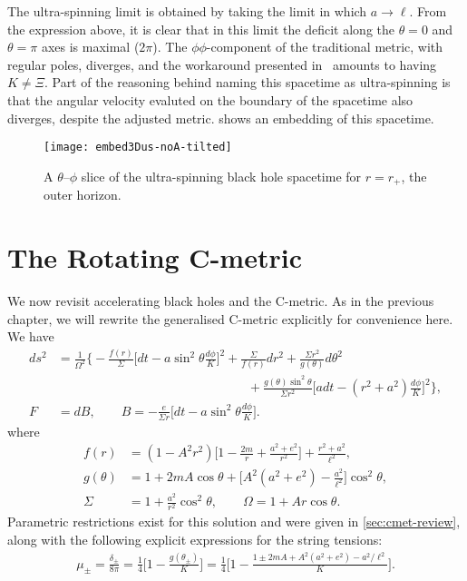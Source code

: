 \documentclass[
twoside,
openright,
frontopenright
]{dmathesis}
\newcommand{\nn}{\nonumber}
\begin{document}
The ultra-spinning limit is obtained by taking the limit in which
$a\to\ell$. From the expression above, it is clear that in this limit the
deficit along the $\theta = 0$ and $\theta=\pi$ axes is maximal ($2\pi$). The
$\phi\phi$-component of the traditional metric, with regular poles, diverges,
and the workaround presented in~\cite{Hennigar:2014cfa} amounts to having
$K\neq \Xi$. Part of the reasoning behind naming this spacetime as ultra-spinning
is that the angular velocity evaluted on the boundary of the spacetime also
diverges, despite the adjusted metric.  shows an
embedding of this spacetime.


\begin{figure}
  \centering
  \texttt{[image: embed3Dus-noA-tilted]}
  \caption{\label{fig:embed3Dus-noA-tilted}A $\theta$--$\phi$ slice of the
    ultra-spinning black hole spacetime for $r=r_+$, the outer horizon.}
\end{figure}

\section{The Rotating C-metric}
We now revisit accelerating black holes and the C-metric. As in the previous
chapter, we will rewrite the generalised C-metric explicitly for convenience
here. We have
\begin{align}
  ds^2 &= \frac{1}{\Omega^2}\bigg\{ -\frac{f(r)}{\Sigma}\Big[dt - a\sin^2\theta
         \frac{d\phi}{K} \Big]^2 + \frac{\Sigma}{f(r)}dr^2 + \frac{\Sigma
         r^2}{g(\theta)}d\theta^2 \nn\\
  &\hspace{15em} + \frac{g(\theta) \sin^2\theta}{\Sigma r^2} \Big[adt-(r^2+a^2)
    \frac{d\phi}{K}\Big]^2\bigg\},\nn\\ 
  F&=dB,\qquad B=-\frac{e}{\Sigma r}\Big[dt-a\sin^2\theta \frac{d\phi}{K}\Big].
\label{eq:cmetric4}
\end{align}
where
\begin{align}
f(r)&=(1-A^2r^2)\bigg[1-\frac{2m}{r}+\frac{a^2+e^2}{r^2}\bigg]+\frac{r^2+a^2}{\ell^2},\nn\\
g(\theta) &=
1+2mA\cos\theta+\bigg[A^2(a^2+e^2)-\frac{a^2}{\ell^2}\bigg]\cos^2\theta,\nn\\ 
\Sigma&=1+\frac{a^2}{r^2}\cos^2\theta, \qquad \Omega=1+Ar\cos\theta.
\label{eq:cmetric4-fun}
\end{align}
Parametric restrictions exist for this solution and were given in
\cref{sec:cmet-review}, along with the following explicit expressions for the
string tensions:
\begin{align}
  \label{eq:tensions}
  \mu_\pm = \frac{\delta_\pm}{8\pi}=\frac14\bigg[1-\frac{g(\theta_\pm)}{K}\bigg] =
  \frac14\bigg[1-\frac{1\pm 2mA + A^2(a^2+e^2)-a^2/\ell^2}{K}\bigg]. 
\end{align}
\end{document}
